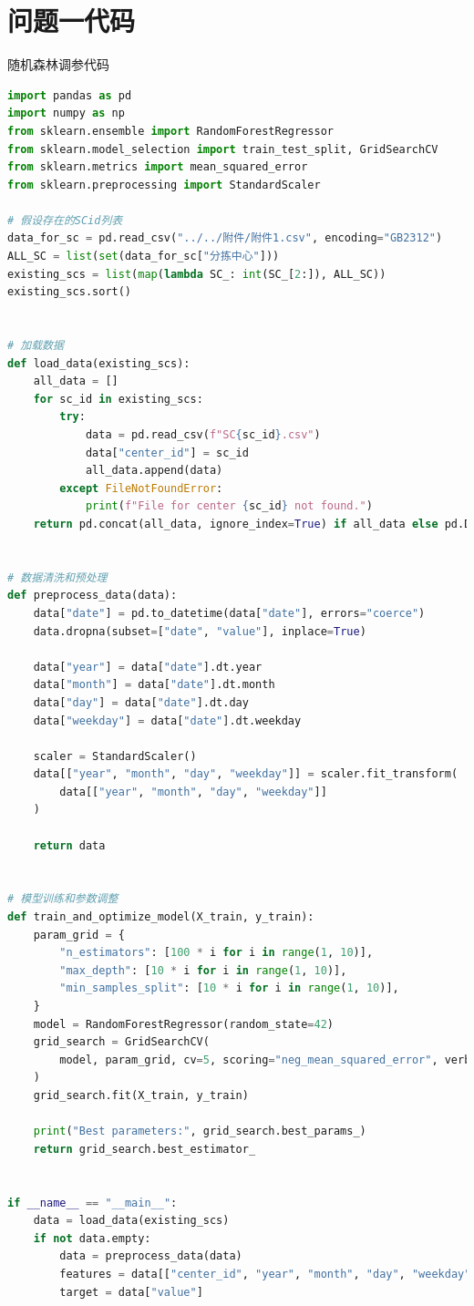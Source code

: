 \documentclass[UTF8,a4paper,10 pt]{article}%
\begin{document}
\section{问题一代码}
\noindent 随机森林调参代码
\begin{lstlisting}[language=python]
import pandas as pd
import numpy as np
from sklearn.ensemble import RandomForestRegressor
from sklearn.model_selection import train_test_split, GridSearchCV
from sklearn.metrics import mean_squared_error
from sklearn.preprocessing import StandardScaler

# 假设存在的SCid列表
data_for_sc = pd.read_csv("../../附件/附件1.csv", encoding="GB2312")
ALL_SC = list(set(data_for_sc["分拣中心"]))
existing_scs = list(map(lambda SC_: int(SC_[2:]), ALL_SC))
existing_scs.sort()


# 加载数据
def load_data(existing_scs):
    all_data = []
    for sc_id in existing_scs:
        try:
            data = pd.read_csv(f"SC{sc_id}.csv")
            data["center_id"] = sc_id
            all_data.append(data)
        except FileNotFoundError:
            print(f"File for center {sc_id} not found.")
    return pd.concat(all_data, ignore_index=True) if all_data else pd.DataFrame()


# 数据清洗和预处理
def preprocess_data(data):
    data["date"] = pd.to_datetime(data["date"], errors="coerce")
    data.dropna(subset=["date", "value"], inplace=True)

    data["year"] = data["date"].dt.year
    data["month"] = data["date"].dt.month
    data["day"] = data["date"].dt.day
    data["weekday"] = data["date"].dt.weekday

    scaler = StandardScaler()
    data[["year", "month", "day", "weekday"]] = scaler.fit_transform(
        data[["year", "month", "day", "weekday"]]
    )

    return data


# 模型训练和参数调整
def train_and_optimize_model(X_train, y_train):
    param_grid = {
        "n_estimators": [100 * i for i in range(1, 10)],
        "max_depth": [10 * i for i in range(1, 10)],
        "min_samples_split": [10 * i for i in range(1, 10)],
    }
    model = RandomForestRegressor(random_state=42)
    grid_search = GridSearchCV(
        model, param_grid, cv=5, scoring="neg_mean_squared_error", verbose=2
    )
    grid_search.fit(X_train, y_train)

    print("Best parameters:", grid_search.best_params_)
    return grid_search.best_estimator_


if __name__ == "__main__":
    data = load_data(existing_scs)
    if not data.empty:
        data = preprocess_data(data)
        features = data[["center_id", "year", "month", "day", "weekday"]]
        target = data["value"]


\end{lstlisting}
\end{document}
